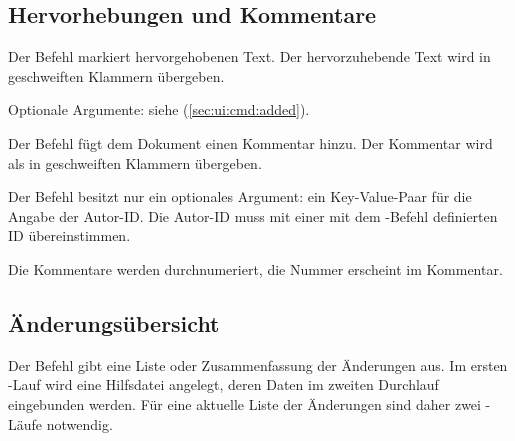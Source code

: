 


\subsection{Hervorhebungen und Kommentare}
\label{sec:ui:comment}

\localtableofcontents



Der Befehl  markiert hervorgehobenen Text.
Der hervorzuhebende Text wird in geschweiften Klammern übergeben.

Optionale Argumente: siehe  (\autoref{sec:ui:cmd:added}).





Der Befehl  fügt dem Dokument einen Kommentar hinzu.
Der Kommentar wird als in geschweiften Klammern übergeben.

Der Befehl besitzt nur ein optionales Argument: ein Key-Value-Paar für die Angabe der Autor-ID.
Die Autor-ID muss mit einer mit dem -Befehl definierten ID übereinstimmen.

Die Kommentare werden durchnumeriert, die Nummer erscheint im Kommentar.







\subsection{Änderungsübersicht}
\label{sec:ui:overview}




Der Befehl  gibt eine Liste oder Zusammenfassung der Änderungen aus.
Im ersten -Lauf wird eine Hilfsdatei angelegt, deren Daten im zweiten Durchlauf eingebunden werden.
Für eine aktuelle Liste der Änderungen sind daher zwei -Läufe notwendig.

